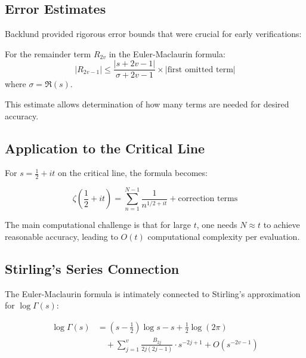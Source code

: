\subsection{Error Estimates}

Backlund provided rigorous error bounds that were crucial for early verifications:

\begin{theorem}
For the remainder term $R_{2v}$ in the Euler-Maclaurin formula:
\begin{equation}
|R_{2v-1}| \leq \frac{|s+2v-1|}{\sigma+2v-1} \times |\text{first omitted term}|
\end{equation}
where $\sigma = \Re(s)$.
\end{theorem}

This estimate allows determination of how many terms are needed for desired accuracy.

\subsection{Application to the Critical Line}

For $s = \frac{1}{2} + it$ on the critical line, the formula becomes:

\begin{equation}
\zeta\left(\frac{1}{2} + it\right) = \sum_{n=1}^{N-1} \frac{1}{n^{1/2 + it}} + \text{correction terms}
\end{equation}

The main computational challenge is that for large $t$, one needs $N \approx t$ to achieve reasonable accuracy, leading to $O(t)$ computational complexity per evaluation.

\subsection{Stirling's Series Connection}

The Euler-Maclaurin formula is intimately connected to Stirling's approximation for $\log \Gamma(s)$:

\begin{theorem}
\begin{align}
\log \Gamma(s) &= \left(s - \frac{1}{2}\right)\log s - s + \frac{1}{2}\log(2\pi) \\
&\quad + \sum_{j=1}^{v} \frac{B_{2j}}{2j(2j-1)} \cdot s^{-2j+1} + O(s^{-2v-1})
\end{align}
\end{theorem}


